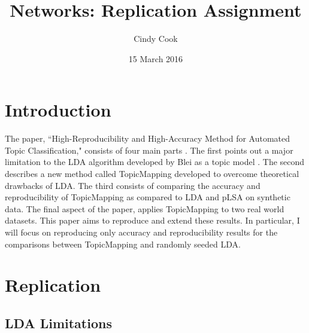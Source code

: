 \documentclass[12pt]{article}
\begin{document}
	
	\title{Networks:  Replication Assignment} 
	
	\author{Cindy Cook}
	\date{15 March 2016}
	\maketitle
	\vspace{-12mm}

\section{Introduction}

The paper, ``High-Reproducibility and High-Accuracy Method for Automated Topic Classification," consists of four main parts \cite{main}. The first points out a major limitation to the LDA algorithm developed by Blei as a topic model \cite{lda}. The second describes a new method called TopicMapping developed to overcome theoretical drawbacks of LDA. The third consists of comparing the accuracy and reproducibility of TopicMapping as compared to LDA and pLSA \cite{plsa} on synthetic data. The final aspect of the paper, applies TopicMapping to two real world datasets. This paper aims to reproduce and extend these results. In particular, I will focus on reproducing only accuracy and reproducibility results for the comparisons between TopicMapping and randomly seeded LDA.     

\section{Replication}
\subsection{LDA Limitations}
\end{document}
